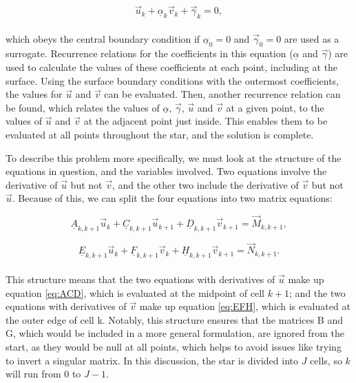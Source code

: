 \documentclass[11pt]{amsart}
\begin{document}
\begin{equation} \label{eq:relation}
\vec{u}_{k}  + \underline{\alpha}_{k}  \vec{v}_{k}  + \vec{\gamma}_{k}  = 0,
\end{equation}
\\
which obeys the central boundary condition if $\underline{\alpha}_{0} = 0$ and $\vec{\gamma}_{0} = 0$ are used as a surrogate.  Recurrence relations for the coefficients in this equation ($\underline{\alpha}$ and $\vec{\gamma}$) are used to calculate the values of these coefficients at each point, including at the surface.  Using the surface boundary conditions with the outermost coefficients, the values for $\vec{u}$ and $\vec{v}$ can be evaluated.  Then, another recurrence relation can be found, which relates the values of $\underline{\alpha}$, $\vec{\gamma}$, $\vec{u}$ and $\vec{v}$ at a given point, to the values of $\vec{u}$ and $\vec{v}$ at the adjacent point just inside.  This enables them to be evaluated at all points throughout the star, and the solution is complete.

To describe this problem more specifically, we must look at the structure of the equations in question, and the variables involved.  Two equations involve the derivative of $\vec{u}$ but not $\vec{v}$, and the other two include the derivative of $\vec{v}$ but not $\vec{u}$.  Because of this, we can split the four equations into two matrix equations:

\begin{equation} \label{eq:ACD}
\underline{A}_{k,k+1} \vec{u}_{k} + \underline{C}_{k,k+1} \vec{u}_{k+1} + \underline{D}_{k,k+1} \vec{v}_{k+1} = \vec{M}_{k,k+1},
\end{equation} 

\begin{equation} \label{eq:EFH}
\underline{E}_{k,k+1} \vec{u}_{k} + \underline{F}_{k,k+1} \vec{v}_{k} + \underline{H}_{k,k+1} \vec{v}_{k+1} = \vec{N}_{k,k+1}.
\end{equation} 
\\

This structure means that the two equations with derivatives of $\vec{u}$ make up equation \ref{eq:ACD}, which is evaluated at the midpoint of cell $k+1$; and the two equations with derivatives of $\vec{v}$ make up equation \ref{eq:EFH}, which is evaluated at the outer edge of cell k.  Notably, this structure ensures that the matrices B and G, which would be included in a more general formulation, are ignored from the start, as they would be null at all points, which helps to avoid issues like trying to invert a singular matrix.  In this discussion, the star is divided into $J$ cells, so $k$ will run from $0$ to $J-1$. 
\end{document}
